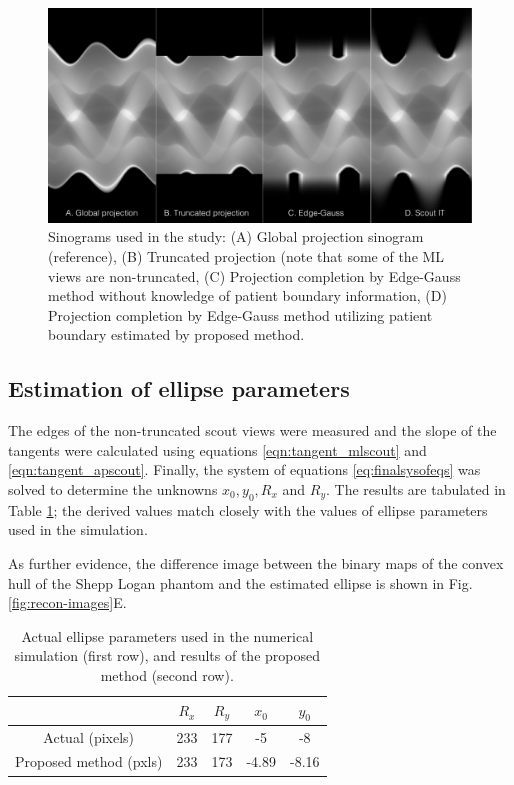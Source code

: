 \documentclass[]{spie}
\begin{document}
\begin{figure}[hbtp]
\centering
\includegraphics[width=15 cm]{fig-sinograms}
\caption{Sinograms used in the study: (A) Global projection sinogram (reference), (B) Truncated projection (note that some of the ML views are non-truncated, (C) Projection completion by Edge-Gauss method without knowledge of patient boundary information, (D) Projection completion by Edge-Gauss method utilizing patient boundary estimated by proposed method. \label{fig:sinograms}
}
\end{figure}

\subsection{Estimation of ellipse parameters}

The edges of the non-truncated scout views were measured and the slope of the tangents were calculated using equations \ref{eqn:tangent_mlscout} and \ref{eqn:tangent_apscout}. Finally, the system of equations \ref{eq:finalsysofeqs} was solved to determine the unknowns $x_0, y_0, R_x$ and $R_y$. The results are tabulated in Table \ref{tab:ellipse_params}; the derived values match closely with the values of ellipse parameters used in the simulation. 

As further evidence, the difference image between the binary maps of the convex hull of the Shepp Logan phantom and the estimated ellipse is shown in Fig. \ref{fig:recon-images}E. 

\begin{table}
\begin{center}
\begin{tabular}{|c|c|c|c|c|}
\hline 
 & \textbf{$R_x$} & \textbf{$R_y$} & \textbf{$x_0$} & \textbf{$y_0$} \\ 
\hline 
Actual (pixels) & 233 & 177 & -5 & -8 \\ 
\hline 
Proposed method (pxls) & 233 & 173 & -4.89 & -8.16 \\ 
\hline 
\end{tabular} 
\caption{\label{tab:ellipse_params} Actual ellipse parameters used in the numerical simulation (first row), and results of the proposed method (second row).}
\end{center}
\end{table}
\end{document}
